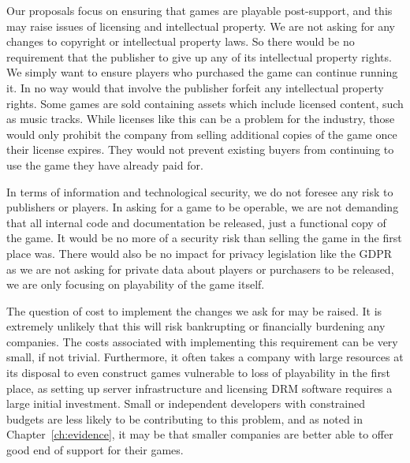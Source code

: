 Our proposals focus on ensuring that games are playable post-support, and this may raise issues of licensing and intellectual property.
We are not asking for any changes to copyright or intellectual property laws.
So there would be no requirement that the publisher to give up any of its intellectual property rights.
We simply want to ensure players who purchased the game can continue running it.
In no way would that involve the publisher forfeit any intellectual property rights.
Some games are sold containing \glspl{asset} which include licensed content, such as music tracks.
While licenses like this can be a problem for the industry, those would only prohibit the company from selling additional copies of the game once their license expires.
They would not prevent existing buyers from continuing to use the game they have already paid for.

In terms of information and technological security, we do not foresee any risk to publishers or players.
In asking for a game to be operable, we are not demanding that all internal code and documentation be released, just a functional copy of the game.
It would be no more of a security risk than selling the game in the first place was.
There would also be no impact for privacy legislation like the GDPR as we are not asking for private data about players or purchasers to be released,
we are only focusing on playability of the game itself.

The question of cost to implement the changes we ask for may be raised.
It is extremely unlikely that this will risk bankrupting or financially burdening any companies.
The costs associated with implementing this requirement can be very small, if not trivial\cn.
Furthermore, it often takes a company with large resources at its disposal to even construct games vulnerable to loss of playability in the first place,
as setting up server infrastructure and licensing DRM software requires a large initial investment.
Small or independent developers with constrained budgets are less likely to be contributing to this problem,
and as noted in Chapter~\ref{ch:evidence}, it may be that smaller companies are better able to offer good end of support for their games.
